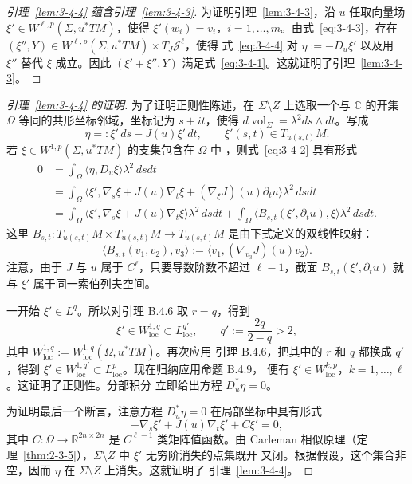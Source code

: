 \begin{proof}[引理~\ref{lem:3-4-4} 蕴含引理~\ref{lem:3-4-3}]
为证明引理~\ref{lem:3-4-3}，沿 $u$ 任取向量场
$\xi'\in W^{\ell,p}(\Sigma,u^*TM)$，使得
$\xi'(w_i)=v_i$，$i=1,\ldots,m$。由式~\eqref{eq:3-4-3}，存在
$(\xi'',Y)\in W^{\ell,p}(\Sigma,u^*TM)\times T_J\mathcal J^\ell$，使得
式~\eqref{eq:3-4-4} 对 $\eta:=-D_u\xi'$ 以及用 $\xi''$ 替代 $\xi$ 成立。因此
$(\xi'+\xi'',Y)$ 满足式~\eqref{eq:3-4-1}。这就证明了引理~\ref{lem:3-4-3}。
\end{proof}

\begin{proof}[引理~\ref{lem:3-4-4} 的证明]
为了证明正则性陈述，在 $\Sigma\setminus Z$ 上选取一个与
$\mathbb C$ 的开集 $\Omega$ 等同的共形坐标邻域，坐标记为 $s+it$，使得
$d\operatorname{vol}_\Sigma=\lambda^2ds\wedge dt$。写成
\[
  \eta=: \xi'\,ds-J(u)\xi'\,dt,
  \qquad
  \xi'(s,t)\in T_{u(s,t)}M.
\]
若 $\xi\in W^{1,p}(\Sigma,u^*TM)$ 的支集包含在 $\Omega$ 中
，则式~\eqref{eq:3-4-2}
具有形式
\begin{align*}
  0
  &=\int_\Omega\langle\eta,D_u\xi\rangle\lambda^2\,dsdt\\
  &=\int_\Omega
    \bigl\langle\xi',\nabla_s\xi+J(u)\nabla_t\xi
    +(\nabla_\xi J)(u)\partial_tu\bigr\rangle
    \lambda^2\,dsdt\\
  &=\int_\Omega
    \langle\xi',\nabla_s\xi+J(u)\nabla_t\xi\rangle
    \lambda^2\,dsdt
    +\int_\Omega
    \langle B_{s,t}(\xi',\partial_tu),\xi\rangle
    \lambda^2\,dsdt.
\end{align*}
这里 $B_{s,t}:T_{u(s,t)}M\times T_{u(s,t)}M\to T_{u(s,t)}M$ 是由下式定义的双线性映射：
\[
  \langle B_{s,t}(v_1,v_2),v_3\rangle
  :=\langle v_1,(\nabla_{v_3}J)(u)v_2\rangle.
\]
注意，由于 $J$ 与 $u$ 属于 $C^\ell$，只要导数阶数不超过 $\ell-1$，截面
$B_{s,t}(\xi',\partial_tu)$ 就与 $\xi'$ 属于同一索伯列夫空间。

一开始 $\xi'\in L^q$。所以对引理 B.4.6 取 $r=q$，得到
\[
  \xi'\in W_{\mathrm{loc}}^{1,q}\subset L_{\mathrm{loc}}^{q'},
  \qquad q':=\frac{2q}{2-q}>2,
\]
其中 $W_{\mathrm{loc}}^{1,q}:=W_{\mathrm{loc}}^{1,q}(\Omega,u^*TM)$。再次应用
引理 B.4.6，把其中的 $r$ 和 $q$ 都换成 $q'$，得到
$\xi'\in W_{\mathrm{loc}}^{1,q'}\subset L_{\mathrm{loc}}^p$。现在归纳应用命题 B.4.9，
便有 $\xi'\in W_{\mathrm{loc}}^{k,p}$，$k=1,\ldots,\ell$。这证明了正则性。分部积分
立即给出方程 $D_u^*\eta=0$。

为证明最后一个断言，注意方程 $D_u^*\eta=0$ 在局部坐标中具有形式
\[
  -\nabla_s\xi'+J(u)\nabla_t\xi'+C\xi'=0,
\]
其中 $C:\Omega\to\mathbb R^{2n\times2n}$ 是 $C^{\ell-1}$ 类矩阵值函数。由 Carleman
相似原理（定理~\ref{thm:2-3-5}），$\Sigma\setminus Z$ 中 $\xi'$ 无穷阶消失的点集既开
又闭。根据假设，这个集合非空，因而 $\eta$ 在 $\Sigma\setminus Z$ 上消失。这就证明了
引理~\ref{lem:3-4-4}。
\end{proof}


